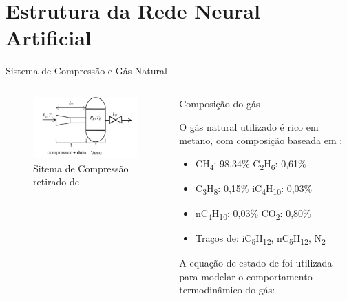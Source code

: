 \section{Estrutura da Rede Neural Artificial}

\begin{frame}{Sistema de Compressão e Gás Natural}
    \begin{columns}[T] %
        \begin{column}{0.48\textwidth}
        \begin{figure}
            \centering
            \includegraphics[width=1.1\linewidth]{figures/compressao.png}
            \caption{Sitema de Compressão retirado de \cite{Meira2022}}
            \label{fig:enter-label}
        \end{figure}
        \end{column}

        \begin{column}{0.52\textwidth}
            \scriptsize
        \begin{block}{Composição do gás}
                
            O gás natural utilizado é rico em metano, com composição baseada em \cite{Chaczykowski2009}:
            
            \vspace{0.12cm}
            \begin{itemize}  
                \item CH\textsubscript{4}: 98,34\% \quad C\textsubscript{2}H\textsubscript{6}: 0,61\%
                \item C\textsubscript{3}H\textsubscript{8}: 0,15\% \quad iC\textsubscript{4}H\textsubscript{10}: 0,03\%
                \item nC\textsubscript{4}H\textsubscript{10}: 0,03\% \quad CO\textsubscript{2}: 0,80\%
                \item Traços de: iC\textsubscript{5}H\textsubscript{12}, nC\textsubscript{5}H\textsubscript{12}, N\textsubscript{2}
            \end{itemize}
        \end{block}
            \vspace{0.1cm}
            A equação de estado de \cite{Soave1972} foi utilizada para modelar o comportamento termodinâmico do gás:


\end{column}
\end{columns}
\end{frame}
